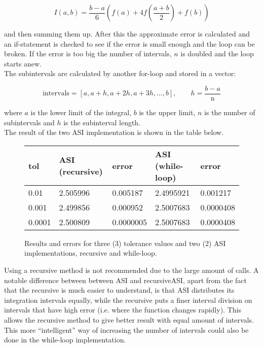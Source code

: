 \documentclass[paper=a4, fontsize=11pt]{article} %
\begin{document}
$$ I(a,b) = \frac{b-a}{6} \left (f(a)+4f\left(\frac{a+b}{2}\right) +f(b) \right )$$

and then summing them up. After this the approximate error is calculated and an if-statement is checked to see if the error is small enough and the loop can be broken. If the error is too big the number of intervals, $n$ is doubled and the loop starts anew.\\

The subintervals are calculated by another for-loop and stored in a vector:

$$ \textrm{intervals} = [ a, a+h, a+2h,a+3h,..., b ], \qquad   h = \frac{b-a}{\textrm{n}}$$

where $a$ is the lower limit of the integral, $b$ is the upper limit, $n$ is the number of subintervals and $h$ is the subinterval length.\\

The result of the two ASI implementation is shown in the table below.

 \begin{figure}[htbp]
 \begin{center}
   \begin{tabular}{ l || l  l |  l  l }
     tol & ASI (recursive) & error  & ASI (while-loop) & error \\ \hline
     0.01     & 2.505996 & 0.005187   & 2.4995921 & 0.001217\\ %
     0.001   & 2.499856 & 0.000952   & 2.5007683 & 0.0000408\\
     0.0001 & 2.500809 & 0.0000005  & 2.5007683 & 0.0000408\\  %
   \end{tabular}
 \end{center}
 \caption[table]{Results and errors for three (3) tolerance values and two (2) ASI implementations, recursive and while-loop.}
 	\label{fig:21}
 \end{figure}

Using a recursive method is not recommended due to the large amount of calls. A notable difference between between ASI and recursiveASI, apart from the fact that the recursive is much easier to understand, is that ASI distributes its integration intervals equally, while the recursive puts a finer interval division on intervals that have high error (i.e. where the function changes rapidly). This allows the recursive method to give better result with equal amount of intervals. This more ``intelligent'' way of increasing the number of intervals could also be done in the while-loop implementation.
\end{document}
